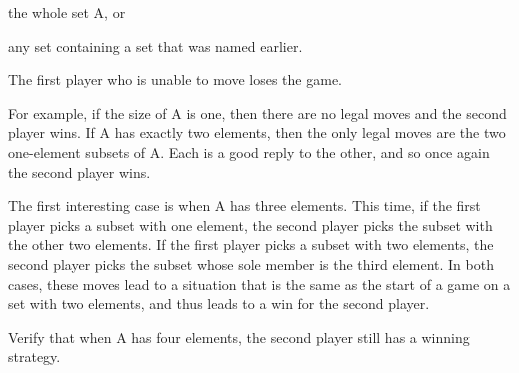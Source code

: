 \documentclass[14pt]{extarticle}
\begin{document}
the whole set A, or

any set containing a set that was named earlier.

The first player who is unable to move loses the game.

For example, if the size of A is one, then there are no legal moves and the second player wins. If A has exactly two elements, then the only legal moves are the two one-element subsets of A. Each is a good reply to the other, and so once again the second player wins.

The first interesting case is when A has three elements. This time, if the first player picks a subset with one element, the second player picks the subset with the other two elements. If the first player picks a subset with two elements, the second player picks the subset whose sole member is the third element. In both cases,
these moves lead to a situation that is the same as the start of a game on a set with two elements, and thus leads to a win for the second player.

Verify that when A has four elements, the second player still has a winning strategy.
\end{document}
